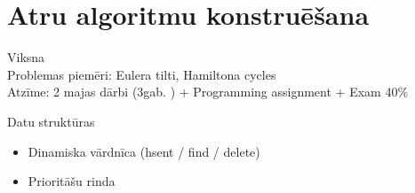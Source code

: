 \section{Atru algoritmu konstruēšana}
Viksna \\

Problemas piemēri: Eulera tilti, Hamiltona cycles\\
Atzīme: 2 majas dārbi (3gab. ) + Programming assignment + Exam 40\%


Datu struktūras
\begin{itemize}
  \item Dinamiska vārdnīca (hsent / find / delete)
  \item Prioritāšu rinda 
\end{itemize}